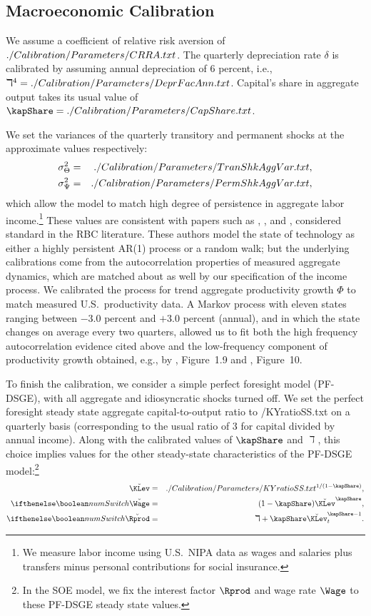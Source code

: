 \documentclass[titlepage]{\econtex}\newcommand{\texname}{cAndCwithStickyE}
\begin{document}
\subsection{Macroeconomic Calibration}
\label{sec:MacroCal}

We assume a coefficient of relative risk aversion of
$
 ./Calibration/Parameters/CRRA.txt
$. 
The quarterly depreciation rate $\delta$ is calibrated by assuming annual depreciation of 6 percent,
i.e.,
$
\daleth^{4}=  ./Calibration/Parameters/DeprFacAnn.txt
$.  Capital's share in aggregate output takes its usual value of
$
\kapShare=  \ParmDir/CapShare.txt
$.

We set the variances of the quarterly transitory and permanent shocks at the approximate values respectively:
\begin{eqnarray*}
   \sigma^{2}_{\Theta} & = &  ./Calibration/Parameters/TranShkAggVar.txt ,
\\ \sigma^{2}_{\Psi}  & =  &  ./Calibration/Parameters/PermShkAggVar.txt ,
\end{eqnarray*}
which allow the model to match high degree of persistence in aggregate labor income.\footnote{We measure labor income using U.S.\ NIPA data as wages and salaries plus transfers minus personal contributions for social insurance.} These values are consistent with papers such as \cite{jermannProduction}, \cite{bcfHabits}, and \cite{ckmCritique}, considered standard  in the RBC literature. These authors model the state of technology as either a highly persistent AR(1) process or a random walk; but the underlying calibrations come from the autocorrelation properties of measured aggregate dynamics, which are matched about as well by our specification of the income process.  We calibrated the process for trend aggregate productivity growth $\Phi$ to match measured U.S.\ productivity data.  A Markov process with eleven states ranging between $-3.0$ percent and $+3.0$ percent (annual), and in which the state changes on average every two quarters, allowed us to fit both the high frequency autocorrelation evidence cited above and the low-frequency component of productivity growth obtained, e.g., by \cite{sswNAIRU}, Figure~1.9 and \cite{fernald:disappointingRecovery}, Figure~10.

To finish the calibration, we consider a simple perfect foresight model (PF-DSGE), with all aggregate and idiosyncratic shocks turned off.  We set the perfect foresight steady state aggregate capital-to-output ratio to  \ParmDir/KYratioSS.txt on a quarterly basis (corresponding to the usual ratio of 3 for capital divided by annual income).  Along with the calibrated values of $\kapShare$ and $\daleth$, this choice implies values for the other steady-state characteristics of the PF-DSGE model:\footnote{In the SOE model, we fix the interest factor $\Rprod$ and wage rate $\Wage$ to these PF-DSGE steady state values.}
\begin{eqnarray*}
   \breve{\KLev} & = &  \ParmDir/KYratioSS.txt ^{1/(1-\kapShare)},
\\ \ifnumSw \breve{\Wage} & = & (1-\kapShare) \breve{\KLev}^{\kapShare},
\\ \ifnumSw \breve{\Rprod} & = & \daleth+\kapShare \breve{\KLev}^{\kapShare-1}_{t}
.
\end{eqnarray*}
\end{document}
